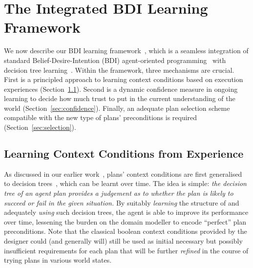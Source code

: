 \section{The Integrated BDI Learning Framework}\label{sec:framework}


We now describe our BDI learning framework~\cite{airiau09:enhancing,singh10:extending,singh10:learning}, which is a seamless integration of standard Belief-Desire-Intention (BDI) agent-oriented programming~\cite{WooldridgeBook} with decision tree learning~\cite{Mitchell97:ML}. 
%
Within the framework, three mechanisms are crucial. First is a principled approach to learning context conditions based on execution experiences (Section~\ref{sec:context}). Second is a dynamic confidence measure in ongoing learning to decide how much trust to put in the current understanding of the world (Section~\ref{sec:confidence}). Finally, an adequate plan selection scheme compatible with the new type of plans' preconditions is required (Section~\ref{sec:selection}).

\subsection{Learning Context Conditions from Experience}\label{sec:context}

As discussed in our earlier work~\cite{airiau09:enhancing,singh10:extending,singh10:learning}, plans' context conditions are first generalised to decision trees~\cite{Mitchell97:ML}, which can be learnt over time.
The idea is simple: \emph{the decision tree of an agent plan provides a judgement as to whether the plan is likely to succeed or fail in the given situation.}
By suitably \emph{learning} the structure of and adequately \emph{using} such decision trees, the agent is able to improve its performance over time, lessening the burden on the domain modeller to encode ``perfect'' plan preconditions. Note that the classical boolean context conditions provided by the designer could (and generally will) still be used as initial necessary but possibly insufficient requirements for each plan that will be further \emph{refined} in the course of trying plans in various world states.

